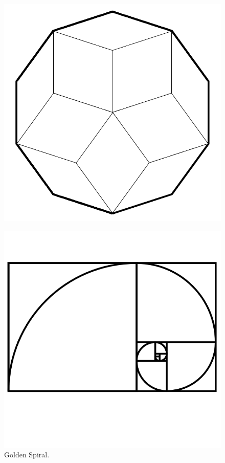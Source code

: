 \documentclass[17pt]{extreport}
\begin{document}
	\begin{figure}
		\centering
		\includegraphics[width=6.25in]{imageserver/uploadimages/image7.png}
	\end{figure}
	
	\begin{figure}
		\centering
		\includegraphics[width=6.25in]{imageserver/uploadimages/image18.png}
		\caption{Golden Spiral.}
	\end{figure}
	
\end{document}
